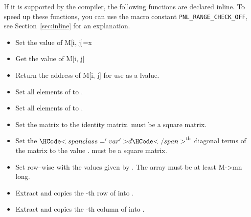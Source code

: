 If it is supported by the compiler, the following functions are declared
inline. To speed up these functions, you can use the macro constant
\texttt{PNL_RANGE_CHECK_OFF}, see Section~\ref{sec:inline} for an explanation. 
\begin{itemize}
\item {}
  \sshortdescribe Set the value of M[i, j]=x  

\item {}
  \sshortdescribe Get the value of M[i, j]  

\item {}
  \sshortdescribe Return the address of M[i, j] for use as a lvalue.

\item {}
  \sshortdescribe Set all elements of  to .
\item {}
  \sshortdescribe Set all elements of  to .
  
\item {}
  \sshortdescribe Set the matrix  to the identity
  matrix.  must be a square matrix.

\item {}
  \sshortdescribe Set the $\var{d}^{\text{th}}$ diagonal terms of the matrix
   to the value .  must be a square matrix.
\item {}
  \sshortdescribe Set  row--wise with the values given by . The
  array  must be at least M->mn long.
\item {}
  \sshortdescribe Extract and copies the -th row of  into
  .

\item {}
  \sshortdescribe Extract and copies the -th column of  into .
  

\end{itemize}
